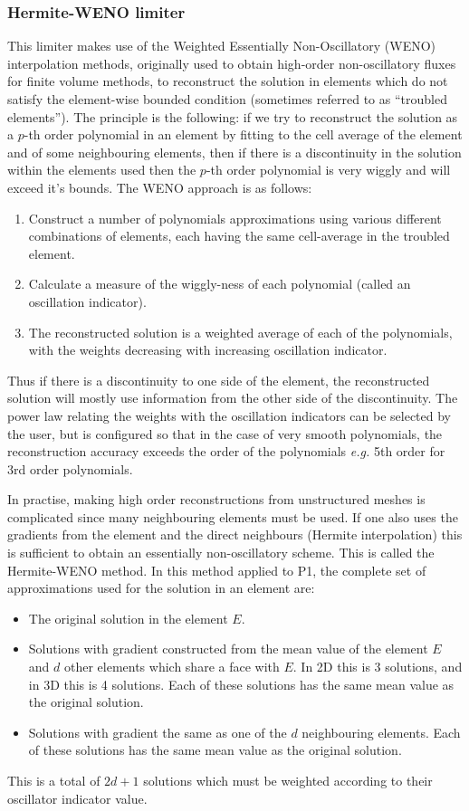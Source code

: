 \subsubsection{Hermite-WENO limiter}
\label{sect:ND_hermite_weno_limiter}
This limiter makes use of the Weighted Essentially Non-Oscillatory
(WENO) interpolation methods, originally used to obtain high-order
non-oscillatory fluxes for finite volume methods, to reconstruct the
solution in elements which do not satisfy the element-wise bounded
condition (sometimes referred to as ``troubled elements''). The
principle is the following: if we try to reconstruct the solution as a
$p$-th order polynomial in an element by fitting to the cell average
of the element and of some neighbouring elements, then if there is a
discontinuity in the solution within the elements used then the $p$-th
order polynomial is very wiggly and will exceed it's bounds. The WENO
approach is as follows:
\begin{enumerate}
\item Construct a number of polynomials approximations using various
  different combinations of elements, each having the same cell-average
  in the troubled element.
\item Calculate a measure of the wiggly-ness of each polynomial (called 
an oscillation indicator).
\item The reconstructed solution is a weighted average of each of the
  polynomials, with the weights decreasing with increasing oscillation
  indicator.
\end{enumerate}
Thus if there is a discontinuity to one side of the element, the
reconstructed solution will mostly use information from the other side
of the discontinuity. The power law relating the weights with the
oscillation indicators can be selected by the user, but is configured
so that in the case of very smooth polynomials, the reconstruction
accuracy exceeds the order of the polynomials \emph{e.g.} 5th order for
3rd order polynomials. 

In practise, making high order reconstructions from unstructured
meshes is complicated since many neighbouring elements must be
used. If one also uses the gradients from the element and the direct
neighbours (Hermite interpolation) this is sufficient to obtain an
essentially non-oscillatory scheme. This is called the Hermite-WENO
method. In this method applied to P1, the complete set of
approximations used for the solution in an element are:
\begin{itemize}
\item The original solution in the element $E$.
\item Solutions with gradient constructed from the mean value of the
  element $E$ and $d$ other elements which share a face with $E$.  In
  2D this is 3 solutions, and in 3D this is 4 solutions. Each of these
  solutions has the same mean value as the original solution.
\item Solutions with gradient the same as one of the $d$ neighbouring
  elements. Each of these solutions has the same mean value as the
  original solution.
\end{itemize}
This is a total of $2d+1$ solutions which must be weighted according
to their oscillator indicator value.


